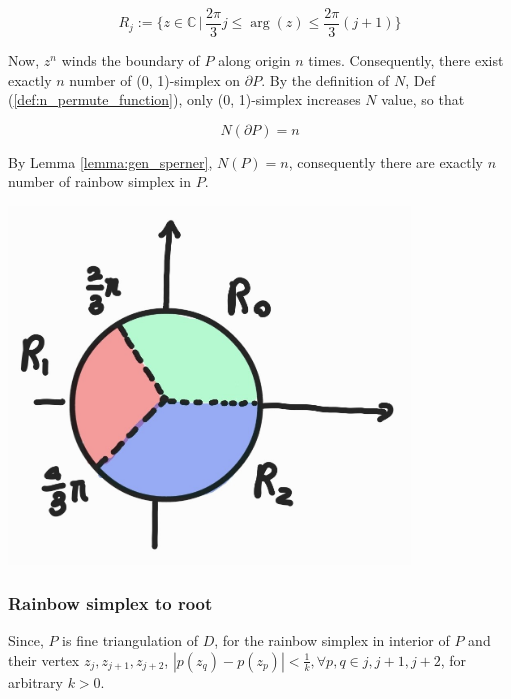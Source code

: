 \documentclass[a4paper,12pt]{article}
\begin{document}
\begin{equation}
    \label{eq:phase_color}
    R_j := \{z \in \mathbb{C}\, | \,\frac{2 \pi}{3} j \leq \arg(z) \leq \frac{2 \pi}{3} (j +1)\}
\end{equation}
{
\noindent
\begin{minipage}{0.45\textwidth}
    Now, $z^n$ winds the boundary of $P$ along origin $n$ times.
    Consequently, there exist exactly $n$ number of (0, 1)-simplex on $\partial P$.
    By the definition of $N$, Def (\ref{def:n_permute_function}), only (0, 1)-simplex 
    increases $N$ value, so that

    \begin{equation}
        N(\partial P) = n
    \end{equation}

    By Lemma \ref{lemma:gen_sperner}, $N(P) = n$, consequently there are exactly $n$ number of rainbow simplex 
    in $P$.
\end{minipage}
\hfill
\begin{minipage}{0.45\textwidth}
    \centering
        \includegraphics[width=0.8\textwidth]{phase.jpeg}
\end{minipage}
}

\subsubsection{Rainbow simplex to root}
Since, $P$ is fine triangulation of $D$, for the rainbow simplex in interior of $P$ and
their vertex $z_j, z_{j+1}, z_{j+2}$, 
$|p(z_q)- p(z_p)| < \frac{1}{k}, \forall p, q \in {j, j+1, j+2}$, for arbitrary $k>0$.
\end{document}
